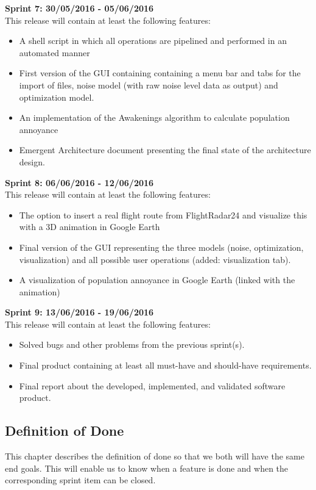 ﻿\documentclass[a4paper,english,fleqn]{exam}
\begin{document}
\textbf{Sprint 7: 30/05/2016 - 05/06/2016} \\
This release will contain at least the following features:
\begin{itemize}
\item A shell script in which all operations are pipelined and performed in an automated manner
\item First version of the GUI containing containing a menu bar and tabs for the import of files, noise model (with raw noise level data as output) and optimization model.
\item An implementation of the Awakenings algorithm to calculate population annoyance
\item Emergent Architecture document presenting the final state of the architecture design. 
\end{itemize}

\textbf{Sprint 8: 06/06/2016 - 12/06/2016} \\
This release will contain at least the following features:
\begin{itemize}
\item The option to insert a real flight route from FlightRadar24 and visualize this with a 3D animation in Google Earth
\item Final version of the GUI representing the three models (noise, optimization, visualization) and all possible user operations (added: visualization tab).
\item A visualization of population annoyance in Google Earth (linked with the animation)
\end{itemize}

\textbf{Sprint 9: 13/06/2016 - 19/06/2016} \\
This release will contain at least the following features:
\begin{itemize}
\item Solved bugs and other problems from the previous sprint(s).
\item Final product containing at least all must-have and should-have requirements.
\item Final report about the developed, implemented, and validated software product.
\end{itemize}


\newpage 
\subsection{Definition of Done}
This chapter describes the definition of done so that we both will have the same end goals. This will enable us to know when a feature is done and when the corresponding sprint item can be closed.
\end{document}
